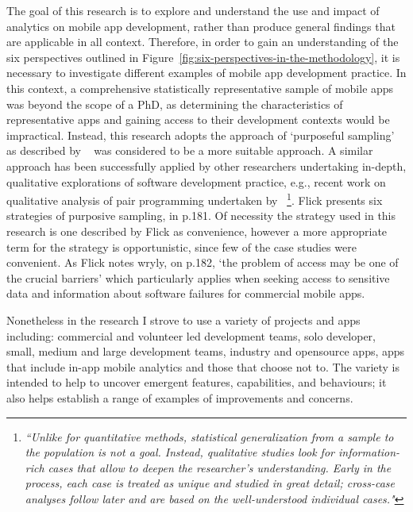 The goal of this research is to explore and understand the use and impact of analytics on mobile app development, rather than produce general findings that are applicable in all context. Therefore, in order to gain an understanding of the six perspectives outlined in Figure~\ref{fig:six-perspectives-in-the-methodology}, it is necessary to investigate different examples of mobile app development practice. In this context, a comprehensive statistically representative sample of mobile apps was beyond the scope of a PhD, as determining the characteristics of representative apps and gaining access to their development contexts would be impractical. Instead, this research adopts the approach of `purposeful sampling'  as described by ~\citep[pp180-182]{flick2018_an_introduction_to_qualitative_research_sixth_ed} was considered to be a more suitable approach. A similar approach has been successfully applied by other researchers undertaking in-depth, qualitative explorations of software development practice, e.g., recent work on qualitative analysis of pair programming undertaken by ~\citep[p.114]{zieris2020_phd_qualitative_analysis_of_knowledge_transfer_in_pair_programming}\footnote{\emph{``Unlike for quantitative methods, statistical generalization from a sample to the population is not a goal. Instead, qualitative studies look for information-rich cases that allow to deepen the researcher’s understanding. Early in the process, each case is treated as unique and studied in great detail; cross-case analyses follow later and are based on the well-understood individual cases."}}. 
%
Flick presents six strategies of purposive sampling, in p.181. Of necessity the strategy used in this research is one described by Flick as convenience, however a more appropriate term for the strategy is opportunistic, since few of the case studies were convenient. As Flick notes wryly, on p.182, `the problem of access may be one of the crucial barriers' which particularly applies when seeking access to sensitive data and information about software failures for commercial mobile apps.

Nonetheless in the research I strove to use a variety of projects and apps including: commercial and volunteer led development teams, solo developer, small, medium and large development teams, industry and opensource apps, apps that include in-app mobile analytics and those that choose not to. The variety is intended to help to uncover emergent features, capabilities, and behaviours; it also helps establish a range of examples of improvements and concerns. 

